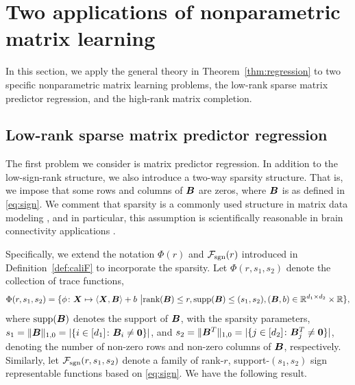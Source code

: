 \documentclass[aos]{imsart}
\theoremstyle{definition}
\def\caliF{\tF_{\textup{sgn}}}
\begin{document}
\section{Two applications of nonparametric matrix learning}
\label{sec:examples}

In this section, we apply the general theory in Theorem~\ref{thm:regression} to two specific nonparametric matrix learning problems, the low-rank sparse matrix predictor regression, and the high-rank matrix completion. 



\subsection{Low-rank sparse matrix predictor regression}
\label{sec:sparse}

The first problem we consider is matrix predictor regression. In addition to the low-sign-rank structure, we also introduce a two-way sparsity structure. That is, we impose that some rows and columns of $\bm B$ are zeros, where $\bm B$ is as defined in \eqref{eq:sign}. We comment that sparsity is a commonly used structure in matrix data modeling \citep{zhou2014regularized}, and in particular, this assumption is scientifically reasonable in brain connectivity applications \citep{Zhang2015}.

Specifically, we extend the notation $\Phi(r)$ and $\caliF(r)$ introduced in Definition~\ref{def:caliF} to incorporate the sparsity. Let $\Phi(r,s_1,s_2)$ denote the collection of trace functions, 
\begin{align*} %
\Phi(r,s_1,s_2)=\{\phi\colon \mX\mapsto \langle \mX, \mB \rangle +b \ \big| \text{rank}(\mB)\leq r,  \text{supp}(\mB)\leq (s_1,s_2), (\mB,b)\in\mathbb{R}^{d_1\times d_2}\times \mathbb{R}\},
\end{align*}
where $\text{supp}(\bm B)$ denotes the support of $\bm B$, with the sparsity parameters, $s_1=\lVert\bm B\rVert_{1,0}=|\{i\in[d_1]\colon \bm B_i\neq \mathbf{0}\}|$, and $s_2=\lVert\bm B^T\rVert_{1,0}=|\{j\in[d_2]\colon \bm B^T_j\neq \mathbf{0}\}|$, denoting the number of non-zero rows and non-zero columns of $\bm B$, respectively. Similarly, let $\caliF(r,s_1,s_2)$ denote a family of rank-$r$, support-$(s_1,s_2)$ sign representable functions based on \eqref{eq:sign}. We have the following result. 
\end{document}
